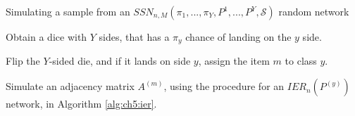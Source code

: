 \begin{algorithm}[h]\caption{Simulating a sample from an $SSN_{n, M}(\pi_1, ..., \pi_Y, P^1, ..., P^Y, \mathcal S)$ random network}
\label{alg:ch5:ssn}
\SetAlgoLined
{}

Obtain a dice with $Y$ sides, that has a $\pi_y$ chance of landing on the $y$ side.

 {
    Flip the $Y$-sided die, and if it lands on side $y$, assign the item $m$ to class $y$.

    Simulate an adjacency matrix $A^{(m)}$, using the procedure for an $IER_n(P^{(y)})$ network, in Algorithm \ref{alg:ch5:ier}.
}

\end{algorithm}
